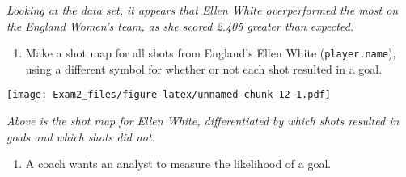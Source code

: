 \documentclass[]{article}
\newenvironment{Shaded}{\begin{snugshade}}{\end{snugshade}}
\newcommand{\DataTypeTok}[1]{\textcolor[rgb]{0.13,0.29,0.53}{#1}}
\newcommand{\KeywordTok}[1]{\textcolor[rgb]{0.13,0.29,0.53}{\textbf{#1}}}
\newcommand{\NormalTok}[1]{#1}
\newcommand{\OperatorTok}[1]{\textcolor[rgb]{0.81,0.36,0.00}{\textbf{#1}}}
\newcommand{\StringTok}[1]{\textcolor[rgb]{0.31,0.60,0.02}{#1}}
\providecommand{\tightlist}{%
  \setlength{\itemsep}{0pt}\setlength{\parskip}{0pt}}
\begin{document}
\emph{Looking at the data set, it appears that Ellen White overperformed
the most on the England Women's team, as she scored 2.405 greater than
expected.}

\begin{enumerate}
\def\labelenumi{\arabic{enumi}.}
\setcounter{enumi}{1}
\tightlist
\item
  Make a shot map for all shots from England's Ellen White
  (\texttt{player.name}), using a different symbol for whether or not
  each shot resulted in a goal.
\end{enumerate}

\begin{Shaded}
\end{Shaded}

\texttt{[image: Exam2\_files/figure-latex/unnamed-chunk-12-1.pdf]}

\emph{Above is the shot map for Ellen White, differentiated by which
shots resulted in goals and which shots did not.}

\begin{enumerate}
\def\labelenumi{\arabic{enumi}.}
\setcounter{enumi}{2}
\tightlist
\item
  A coach wants an analyst to measure the likelihood of a goal.
\end{enumerate}
\end{document}
